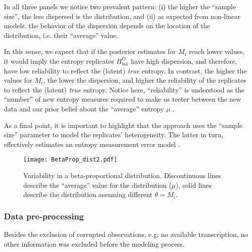In all three panels we notice two prevalent pattern: (i) the higher the ``sample size'', the less dispersed is the distribution, and (ii) as expected from non-linear models, the behavior of the dispersion depends on the location of the distribution, i.e. their ``average'' value.

In this sense, we expect that if the posterior estimates for $M_{i}$ reach lower values, it would imply the entropy replicates $H^{O}_{bik}$ have high dispersion, and therefore, have low reliability to reflect the (latent) \textit{true} entropy. In contrast, the higher the values for $M_{i}$, the lower the dispersion, and higher the reliability of the replicates to reflect the (latent) \textit{true} entropy. Notice here, ``reliability'' is understood as the ``number'' of new entropy measures required to make us teeter between the new data and our prior belief about the ``average'' entropy $\mu$ \cite{Kruschke_2015}.

\begin{comment}
	The value we choose for the prior $\theta$ can be thought of this way: It is the number of new flips of the coin that we would need to make us teeter between the new data and the prior belief about $\mu$. If we would only need a few new flips to sway our beliefs, then our prior beliefs should be represented by a small $\theta$. If we would need a large number of new flips to sway us away from our prior beliefs about $\mu$, then our prior beliefs are worth a very large $\theta$ \cite{Kruschke_2015}.
\end{comment}

As a final point, it is important to highlight that the approach uses the ``sample size'' parameter to model the replicates' heterogeneity. The latter in turn, effectively estimates an entropy measurement error model \cite{Carroll_2006}.
%
\begin{figure} [!h]
	\centering
	\texttt{[image: BetaProp\_dist2.pdf]}
	\caption[Variability in a beta-proportional distribution]{Variability in a beta-proportional distribution. Discontinuous lines describe the ``average'' value for the distribution ($\mu$), solid lines describe the distribution assuming different $\theta = M_{i}$.}
	\label{fig:BetaProp}
\end{figure}
%
%
\subsubsection{Data pre-processing} \label{ssSA:preprocessing}
%
Besides the exclusion of corrupted observations, e.g. no available transcription, no other information was excluded before the modeling process. 

